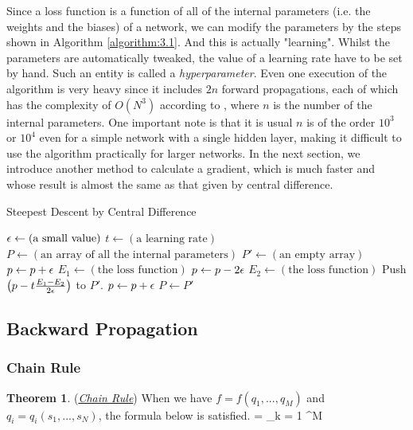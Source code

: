 \documentclass{article}
\theoremstyle{definition}
\newtheorem{__theorem}{Theorem}[section]
\newcommand{\theoremsymbol}{\hfill\square}
\newcommand{\alg}[1]{Algorithm \ref{algorithm:#1}}
\begin{document}
Since a loss function is a function of all of the internal parameters (i.e. the weights and the biases) of a network, we can modify the parameters by the steps shown in \alg{3.1}. And this is actually "learning". Whilst the parameters are automatically tweaked, the value of a learning rate have to be set by hand. Such an entity is called a {\it hyperparameter}. Even one execution of the algorithm is very heavy since it includes $2n$ forward propagations, each of which has the complexity of $O(N^3)$ according to , where $n$ is the number of the internal parameters. One important note is that it is usual $n$ is of the order $10^3$ or $10^4$ even for a simple network with a single hidden layer, making it difficult to use the algorithm practically for larger networks. In the next section, we introduce another method to calculate a gradient, which is much faster and whose result is almost the same as that given by central difference.

\begin{algorithm}
    \caption{Steepest Descent by Central Difference}
    \begin{algorithmic}
    \State $\epsilon \gets (\text{a small value})$
    \State $t \gets (\text{a learning rate})$
    \State $P \gets (\text{an array of all the internal parameters})$
    \State $P' \gets (\text{an empty array})$
    \State
        \State $p \gets p + \epsilon$
        \State $E_1 \gets (\text{the loss function})$ 
        \State $p \gets p - 2\epsilon$
        \State $E_2 \gets (\text{the loss function})$ 
        \State Push $\left( p - t \frac{E_1 - E_2}{2 \epsilon} \right)$ to $P'$.
        \State $p \gets p + \epsilon$
    \EndFor
    \State
    \State $P \gets P'$
    \end{algorithmic}
    \label{algorithm:3.1}
\end{algorithm}

\newpage

\subsection{Backward Propagation}

\subsubsection{Chain Rule}

\begin{__theorem}
(\href{https://en.wikipedia.org/wiki/Chain\_rule}{\it Chain Rule})
When we have $f = f(q_1, ..., q_M)$ and $q_i = q_i(s_1, ..., s_N)$, the formula below is satisfied.
\begineq
{} = \sum _{k = 1} ^M   
\edeq
\theoremsymbol
\label{theorem:3.1}
\end{__theorem}
\end{document}
